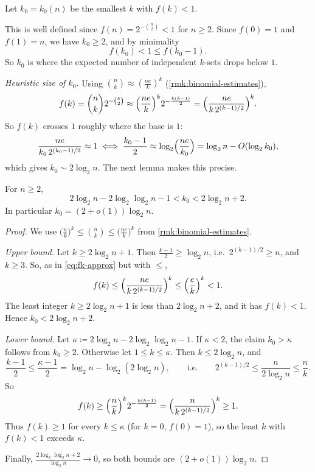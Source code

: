 \begin{definition}\label{def:k0}
    Let \(k_{0} = k_{0}(n)\) be the smallest \(k\) with \(f(k) < 1\).
\end{definition}

This is well defined since \(f(n) = 2^{-\binom{n}{2}} < 1\) for \(n \ge 2\). Since \(f(0) = 1\) and \(f(1) = n\), we have \(k_{0} \ge 2\), and by minimality
\[
    f(k_{0}) < 1 \le f(k_{0} - 1) .
\]
So \(k_{0}\) is where the expected number of independent \(k\)-sets drops below \(1\).

\emph{Heuristic size of \(k_{0}\).} Using \(\binom{n}{k} \approx (\frac{ne}{k})^{k}\) (\autoref{rmk:binomial-estimates}),
\begin{equation}\label{eq:fk-approx}
    f(k) = \binom{n}{k} 2^{-\binom{k}{2}} \approx \Bigl( \frac{ne}{k} \Bigr)^{k} 2^{-\frac{k(k-1)}{2}} = \Bigl( \frac{ne}{k \, 2^{(k-1)/2}} \Bigr)^{k} .
\end{equation}
So \(f(k)\) crosses \(1\) roughly where the base is \(1\):
\[
    \frac{ne}{k_{0} \, 2^{(k_{0}-1)/2}} \approx 1
    \iff \frac{k_{0} - 1}{2} \approx \log_{2} \Bigl( \frac{ne}{k_{0}} \Bigr) = \log_{2} n - O(\log_{2} k_{0}) ,
\]
which gives \(k_{0} \sim 2 \log_{2} n\). The next lemma makes this precise.

\begin{lemma}\label{lem:k0-size}
    For \(n \ge 2\),
    \[
        2 \log_{2} n - 2 \log_{2} \log_{2} n - 1 < k_{0} < 2 \log_{2} n + 2 .
    \]
    In particular \(k_{0} = (2 + o(1)) \log_{2} n\).
\end{lemma}

\begin{proof}
    We use \(\bigl( \frac{n}{k} \bigr)^{k} \le \binom{n}{k} \le \bigl( \frac{ne}{k} \bigr)^{k}\) from \autoref{rmk:binomial-estimates}.

    \emph{Upper bound.} Let \(k \ge 2 \log_{2} n + 1\). Then \(\frac{k-1}{2} \ge \log_{2} n\), i.e.\ \(2^{(k-1)/2} \ge n\), and \(k \ge 3\). So, as in \eqref{eq:fk-approx} but with \(\le\),
    \[
        f(k) \le \Bigl( \frac{ne}{k \, 2^{(k-1)/2}} \Bigr)^{k} \le \Bigl( \frac{e}{k} \Bigr)^{k} < 1 .
    \]
    The least integer \(k \ge 2 \log_{2} n + 1\) is less than \(2 \log_{2} n + 2\), and it has \(f(k) < 1\). Hence \(k_{0} < 2 \log_{2} n + 2\).

    \emph{Lower bound.} Let \(\kappa \coloneqq 2 \log_{2} n - 2 \log_{2} \log_{2} n - 1\). If \(\kappa < 2\), the claim \(k_{0} > \kappa\) follows from \(k_{0} \ge 2\). Otherwise let \(1 \le k \le \kappa\). Then \(k \le 2 \log_{2} n\), and
    \[
        \frac{k - 1}{2} \le \frac{\kappa - 1}{2} = \log_{2} n - \log_{2}(2 \log_{2} n) ,
        \qquad\text{i.e.}\qquad
        2^{(k-1)/2} \le \frac{n}{2 \log_{2} n} \le \frac{n}{k} .
    \]
    So
    \[
        f(k) \ge \Bigl( \frac{n}{k} \Bigr)^{k} 2^{-\frac{k(k-1)}{2}} = \Bigl( \frac{n}{k \, 2^{(k-1)/2}} \Bigr)^{k} \ge 1 .
    \]
    Thus \(f(k) \ge 1\) for every \(k \le \kappa\) (for \(k = 0\), \(f(0) = 1\)), so the least \(k\) with \(f(k) < 1\) exceeds \(\kappa\).

    Finally, \(\frac{2 \log_{2} \log_{2} n + 2}{\log_{2} n} \to 0\), so both bounds are \((2 + o(1)) \log_{2} n\).
\end{proof}

